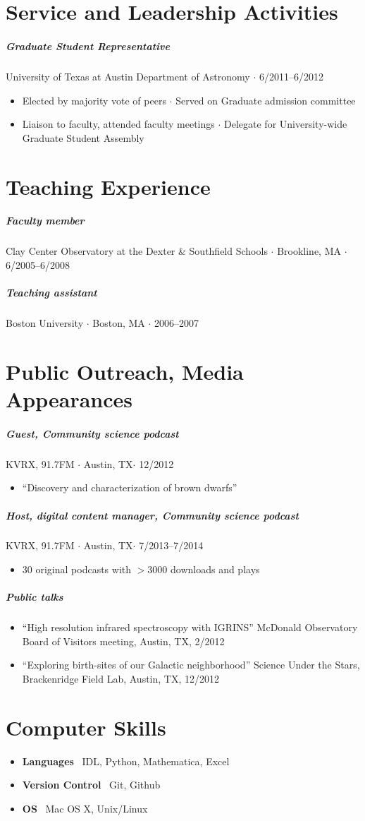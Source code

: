 \documentclass[10pt,letterpaper]{article}
\begin{document}
\section*{Service and Leadership Activities}

\subparagraph{Graduate Student Representative}
University of Texas at Austin Department of Astronomy $\cdot$ 6/2011--6/2012
\begin{itemize}
    \item Elected by majority vote of peers $\cdot$ Served on Graduate admission committee
    \item Liaison to faculty, attended faculty meetings $\cdot$ Delegate for University-wide Graduate Student Assembly
\end{itemize}

\section*{Teaching Experience}

\subparagraph{Faculty member}
Clay Center Observatory at the Dexter \& Southfield Schools  $\cdot$ Brookline, MA $\cdot$ 6/2005--6/2008

\subparagraph{Teaching assistant} 
Boston University $\cdot$ Boston, MA $\cdot$ 2006--2007

\section*{Public Outreach, Media Appearances}

\subparagraph{Guest, Community science podcast}
KVRX, 91.7FM $\cdot$ Austin, TX$\cdot$ 12/2012
	\begin{itemize}
	    \item ``Discovery and characterization of brown dwarfs''
	\end{itemize}
	
\subparagraph{Host, digital content manager, Community science podcast}
KVRX, 91.7FM $\cdot$ Austin, TX$\cdot$ 7/2013--7/2014
	\begin{itemize}
	    \item 30 original podcasts with $>3000$ downloads and plays
	\end{itemize}

\subparagraph{Public talks}
	\begin{itemize}
	    \item ``High resolution infrared spectroscopy with IGRINS'' McDonald Observatory Board of Visitors meeting, Austin, TX, 2/2012
	    \item ``Exploring birth-sites of our Galactic neighborhood'' Science Under the Stars, Brackenridge Field Lab, Austin, TX, 12/2012
	\end{itemize}
	
\section*{Computer Skills}

\begin{itemize}
    \item \textbf{Languages} \ IDL, Python, Mathematica, Excel
    \item \textbf{Version Control} \ Git, Github
    \item \textbf{OS} \ Mac OS X, Unix/Linux
\end{itemize}
\end{document}
